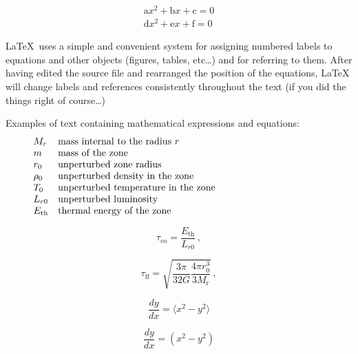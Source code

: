 \documentclass[letterpaper,12pt]{article}
\begin{document}
\begin{eqnarray} \label{eqn:demo5}
{\mathrm a} x^2 + {\mathrm b} x + {\mathrm c} = 0 \nonumber \\
{\mathrm d} x^2 + {\mathrm e} x + {\mathrm f} = 0 \nonumber 
\end{eqnarray}


\LaTeX\, uses a simple and convenient system for assigning numbered labels
to equations and other objects (figures, tables, etc\ldots) and for referring
to them. After having edited the source file and rearranged the position of
the equations, \LaTeX\, will  change labels and references
consistently throughout the text (if you did the things right of
course\ldots) 
 
Examples of text containing mathematical expressions and equations: 
   \[
      \begin{array}{lp{0.8\linewidth}}
         M_{r}  & mass internal to the radius $r$     \\
         m               & mass of the zone                    \\
         r_0             & unperturbed zone radius             \\
         \rho_0          & unperturbed density in the zone     \\
         T_0             & unperturbed temperature in the zone \\
         L_{r0}          & unperturbed luminosity              \\
         E_{\mathrm{th}} & thermal energy of the zone
      \end{array}
   \]

\noindent
    
   \begin{equation}
      \tau_{\mathrm{co}} = \frac{E_{\mathrm{th}}}{L_{r0}} \,,
   \end{equation}


   \begin{equation}
      \tau_{\mathrm{ff}} =
         \sqrt{ 
	 	\frac{3 \pi}{32 G} \frac{4\pi r_0^3}{3 M_{\mathrm{r}}}
	 }\,,
   \end{equation}


\begin{equation}
 \displaystyle \frac{dy}{dx} = \langle x^2 - y^2 \rangle
\end{equation}

\begin{equation}
  \frac{dy}{dx} = \left ( x^2 - y^2 \right )
\end{equation}
\end{document}
